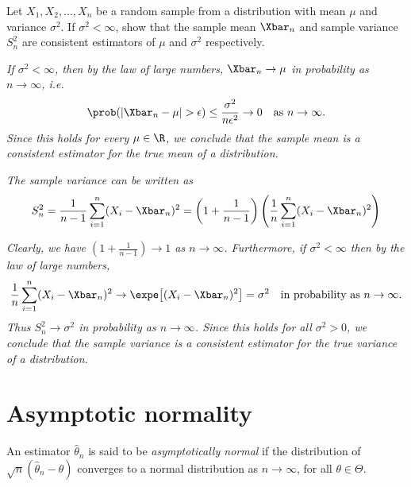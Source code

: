 
\begin{example}
Let $X_1,X_2,\ldots,X_n$ be a random sample from a distribution with mean $\mu$ and variance $\sigma^2$. If $\sigma^2<\infty$, show that the sample mean $\Xbar_n$ and sample variance $S^2_n$ are consistent estimators of $\mu$ and $\sigma^2$ respectively.
\vspace*{1ex}
\begin{solution}
\ben
\it If $\sigma^2<\infty$, then by the law of large numbers, $\Xbar_n\to\mu$ in probability as $n\to\infty$, i.e.
\[
\prob(|\Xbar_n-\mu|>\epsilon) \leq \frac{\sigma^2}{n\epsilon^2} \to 0 \text{\quad as $n\to\infty$.}
\]
Since this holds for every $\mu\in\R$, we conclude that the sample mean is a consistent estimator for the true mean of a distribution.

\it The sample variance can be written as
\[
S^2_n 
	= \frac{1}{n-1}\sum_{i=1}^n (X_i-\Xbar_n)^2 
	= \left(1+\frac{1}{n-1}\right)\left(\frac{1}{n}\sum_{i=1}^n (X_i-\Xbar_n)^2\right)
\]

\bit
\it Clearly, we have $\displaystyle\left(1+\frac{1}{n-1}\right)\to 1$ as $n\to\infty$.
\it Furthermore, if $\sigma^2<\infty$ then by the law of large numbers,
\[
\frac{1}{n}\sum_{i=1}^n (X_i-\Xbar_n)^2 \to \expe\big[(X_i-\Xbar_n)^2\big] = \sigma^2 \text{\quad in probability as $n\to\infty$.}
\]
\it Thus $S^2_n \to \sigma^2$ in probability as $n\to\infty$.
\eit
Since this holds for all $\sigma^2>0$, we conclude that the sample variance is a consistent estimator for the true variance of a distribution.
\een
\end{solution}
\end{example}

\section{Asymptotic normality}

\begin{definition}
An estimator $\hat{\theta}_n$ is said to be \emph{asymptotically normal} if the distribution of $\sqrt{n}(\hat{\theta}_n-\theta)$ converges to a normal distribution as $n\to\infty$, for all $\theta\in\Theta$.
\end{definition}

